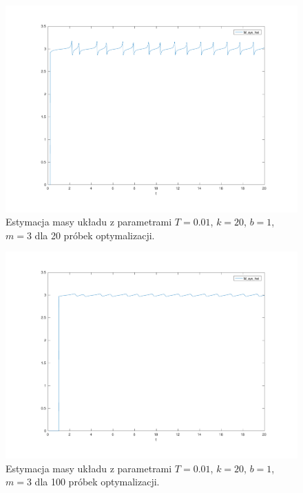 \documentclass[a4paper]{article}
\begin{document}
\begin{figure}[H]
	\includegraphics[width=0.99\linewidth]{system20_mass}
	\centering
	\caption{Estymacja masy układu z parametrami $T=0.01$, $k = 20$, $b = 1$, $m = 3$ dla 20 próbek optymalizacji.}
	\label{fig:system20_mass}
\end{figure}

\begin{figure}[H]
	\includegraphics[width=0.99\linewidth]{system100_mass}
	\centering
	\caption{Estymacja masy układu z parametrami $T=0.01$, $k = 20$, $b = 1$, $m = 3$ dla 100 próbek optymalizacji.}
	\label{fig:system100_mass}
\end{figure}
\end{document}
